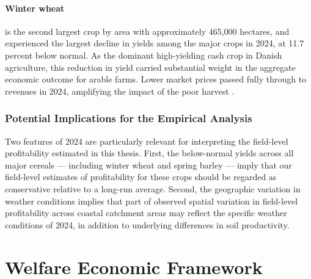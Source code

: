 \documentclass[12pt]{article}
\begin{document}
\paragraph{Winter wheat}
is the second largest crop by area with approximately 
465{,}000 hectares, and experienced the largest decline in yields among the major 
crops in 2024, at 11.7 percent below normal. 
As the dominant high-yielding cash crop in Danish agriculture, this reduction in yield carried substantial weight in the aggregate economic outcome for arable 
farms. 
Lower market prices passed fully through to revenues in 2024, amplifying 
the impact of the poor harvest  \citep{bramsen2024}.


\subsubsection{Potential Implications for the Empirical Analysis}
Two features of 2024 are particularly relevant for interpreting the
field-level profitability estimated in this thesis.
First, the below-normal yields across all major cereals --- including
winter wheat and spring barley --- imply that our field-level estimates of
profitability for these crops should be regarded as conservative relative
to a long-run average.
Second, the geographic variation in weather conditions implies that part
of observed spatial variation in field-level profitability across coastal
catchment areas may reflect the specific weather conditions of 2024,
in addition to underlying differences in soil productivity.


\section{Welfare Economic Framework}
\label{sec:welfare-economic-framework}
\end{document}
